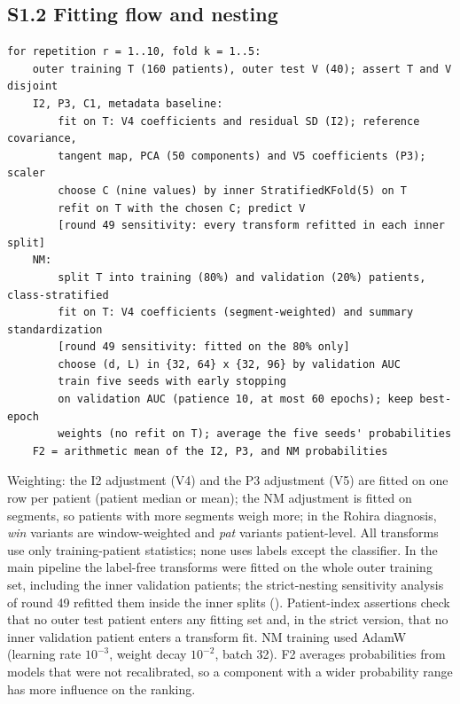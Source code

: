 \subsection*{S1.2 Fitting flow and nesting}
{\footnotesize
\begin{verbatim}
for repetition r = 1..10, fold k = 1..5:
    outer training T (160 patients), outer test V (40); assert T and V disjoint
    I2, P3, C1, metadata baseline:
        fit on T: V4 coefficients and residual SD (I2); reference covariance,
        tangent map, PCA (50 components) and V5 coefficients (P3); scaler
        choose C (nine values) by inner StratifiedKFold(5) on T
        refit on T with the chosen C; predict V
        [round 49 sensitivity: every transform refitted in each inner split]
    NM:
        split T into training (80%) and validation (20%) patients, class-stratified
        fit on T: V4 coefficients (segment-weighted) and summary standardization
        [round 49 sensitivity: fitted on the 80% only]
        choose (d, L) in {32, 64} x {32, 96} by validation AUC
        train five seeds with early stopping
        on validation AUC (patience 10, at most 60 epochs); keep best-epoch
        weights (no refit on T); average the five seeds' probabilities
    F2 = arithmetic mean of the I2, P3, and NM probabilities
\end{verbatim}
}
Weighting: the I2 adjustment (V4) and the P3 adjustment (V5) are fitted on one row per patient (patient median or mean); the NM adjustment is fitted on segments, so patients with more segments weigh more; in the Rohira diagnosis, \textit{win} variants are window-weighted and \textit{pat} variants patient-level. All transforms use only training-patient statistics; none uses labels except the classifier. In the main pipeline the label-free transforms were fitted on the whole outer training set, including the inner validation patients; the strict-nesting sensitivity analysis of round 49 refitted them inside the inner splits (). Patient-index assertions check that no outer test patient enters any fitting set and, in the strict version, that no inner validation patient enters a transform fit.
NM training used AdamW (learning rate $10^{-3}$, weight decay $10^{-2}$, batch 32). F2 averages probabilities from models that were not recalibrated, so a component with a wider probability range has more influence on the ranking.

